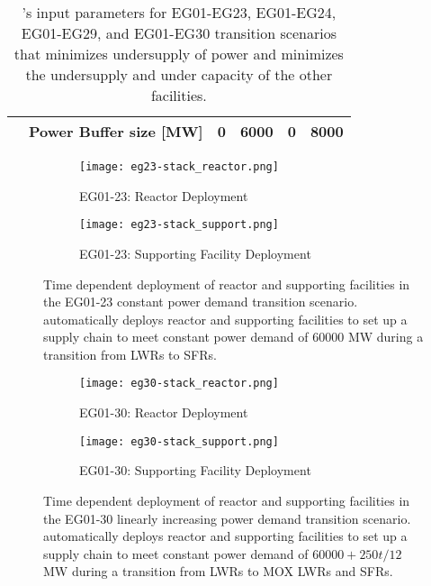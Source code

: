 \begin{table}[]
{\begin{tabular}{|l|l|c|l|l|l|}
											  & Power Buffer size [MW]                                                   & 0 & 6000 & 0 & 8000 \\ \hline
	\end{tabular}%
	}
	\caption{\deploy's input parameters for EG01-EG23, EG01-EG24, EG01-EG29, and 
	EG01-EG30 transition scenarios
	that minimizes undersupply of power and minimizes 
	the undersupply and under capacity of the other facilities. }
	\label{tab:bestinputs}
	\end{table}

\begin{figure}[]
	\centering
	\begin{subfigure}[t]{1.2\textwidth}
		\centering
		\texttt{[image: eg23-stack\_reactor.png]} 
		\caption{EG01-23: Reactor Deployment}
		\label{fig:23reactor}
	\end{subfigure}
	\vspace{1cm}
	\begin{subfigure}[t]{1.2\textwidth}
		\centering
		\texttt{[image: eg23-stack\_support.png]} 
		\caption{EG01-23: Supporting Facility Deployment}
		\label{fig:23support}
	\end{subfigure}
	\hfill
	\caption{Time dependent deployment of reactor and supporting facilities in 
	the EG01-23 constant power demand transition scenario. 
	\deploy automatically deploys reactor and supporting facilities 
	to set up a supply chain to meet constant power demand of $60000$ MW
	during a transition from \glspl{LWR} to \glspl{SFR}. }
	\label{fig:23stack}
\end{figure}

\begin{figure}[]
	\centering
	\begin{subfigure}[t]{1.2\textwidth}
		\centering
		\texttt{[image: eg30-stack\_reactor.png]} 
		\caption{EG01-30: Reactor Deployment}
		\label{fig:30reactor}
	\end{subfigure}
	\vspace{1cm}
	\begin{subfigure}[t]{1.2\textwidth}
		\centering
		\texttt{[image: eg30-stack\_support.png]} 
		\caption{EG01-30: Supporting Facility Deployment}
		\label{fig:30support}
	\end{subfigure}
	\hfill
	\caption{Time dependent deployment of reactor and supporting facilities in 
	the EG01-30 linearly increasing power demand transition scenario. 
	\deploy automatically deploys reactor and supporting facilities 
	to set up a supply chain to meet constant power demand of $60000 + 250t/12$ MW
	during a transition from \glspl{LWR} to MOX LWRs and \glspl{SFR}. }
	\label{fig:30stack}
\end{figure}
